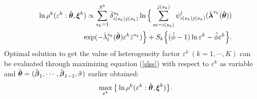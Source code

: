\begin{eqnarray}
&& \ln \rho^k(\varepsilon^k:\hat{\mbox{\boldmath$\theta$}},\mbox{\boldmath$\xi$}^k) 
 \propto \sum_{s_{k}=1}^{S^k} \bar{\delta}_{i(s_{k})j(s_{k})}^{s_{k}} \ln \Big\{ \sum_{m=i(s_{k})}^{j(s_{k})}\psi_{i(s_{k})j(s_{k})}^l(\tilde{\mbox{\boldmath$\lambda$}}^{s_{k}}(\hat{\mbox{\boldmath$\theta$}}))\nonumber\\
&& \hspace{2mm} \exp (-\tilde{\lambda}_{l}^{s_{k}}(\hat{\mbox{\boldmath$\theta$}})\varepsilon^k \bar{z}^{s_{k}}) \Big\} +S_k\Big\{(\hat{\phi}-1) \ln \varepsilon^k -\hat{\phi} \varepsilon^k\Big\} . \label{slss}
\end {eqnarray}
Optimal solution to get the value of heterogeneity factor $\varepsilon^k~(k=1,\cdots,K)$ can be evaluated through maximizing equation (\ref{slss}) with respect to $\varepsilon^k$ as variable and $\hat{\mbox{\boldmath$\theta$}}=(\hat{\mbox{\boldmath$\beta$}}_1,\cdots,\hat{\mbox{\boldmath$\beta$}}_{I-1},\hat{\sigma})$ earlier obtained:
%
\begin{eqnarray}
&& \max_{\varepsilon^k} \big\{\ln \rho^k(\varepsilon^k:\hat{\mbox{\boldmath$\theta$}},\mbox{\boldmath$\xi$}^k)\big\}. \label{sei}
\end{eqnarray}
